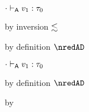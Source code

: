 {\begin{lamportproof*}
    \begin{pfproof}
      \absurdstep
        \begin{pfproof}
          ${\cdot} \vdash_{\mathsf{A}} v_1 : \tau_0$
        \end{pfproof}
    \end{pfproof}

    \begin{pfproof}
        \begin{pfproof}
          by inversion $\lesssim$
        \end{pfproof}
        \begin{pfproof}
          by definition $\nredAD$
        \end{pfproof}
    \end{pfproof}

    \begin{pfproof}
      \absurdstep
        \begin{pfproof}
          ${\cdot} \vdash_{\mathsf{A}} v_1 : \tau_0$
        \end{pfproof}
    \end{pfproof}

    \begin{pfproof}
        \begin{pfproof}
          by definition $\nredAD$
        \end{pfproof}
      \qedstep
        \begin{pfproof}
          by 
        \end{pfproof}
    \end{pfproof}


\end{lamportproof*}}
